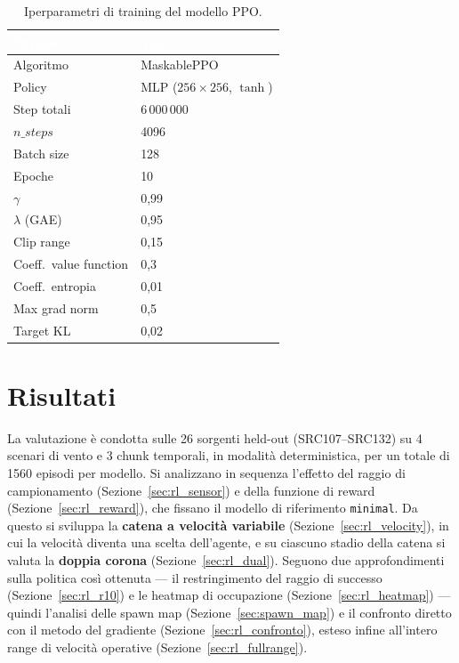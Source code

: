 \begin{table}[H]
\centering
\renewcommand{\arraystretch}{1.2}
\small
\begin{tabular}{L{5cm} C{4cm}}
\toprule
{}
\textcolor{white}{\textbf{Parametro}} & \textcolor{white}{\textbf{Valore}} \\
\midrule
Algoritmo            & MaskablePPO \\
Policy               & MLP ($256\times256$, $\tanh$) \\
Step totali          & $6\,000\,000$ \\
$n\_steps$           & 4096 \\
Batch size           & 128 \\
Epoche               & 10 \\
$\gamma$             & 0{,}99 \\
$\lambda$ (GAE)      & 0{,}95 \\
Clip range           & 0{,}15 \\
Coeff.\ value function & 0{,}3 \\
Coeff.\ entropia     & 0{,}01 \\
Max grad norm        & 0{,}5 \\
Target KL            & 0{,}02 \\
\bottomrule
\end{tabular}
\caption{Iperparametri di training del modello PPO.}
\label{tab:hyper}
\end{table}

\section{Risultati}
\label{sec:rl_risultati}

La valutazione \`e condotta sulle 26 sorgenti held-out (SRC107--SRC132) su 4 scenari di
vento e 3 chunk temporali, in modalit\`a deterministica, per un totale di 1560 episodi
per modello. Si analizzano in sequenza l'effetto del raggio di campionamento
(Sezione~\ref{sec:rl_sensor}) e della funzione di reward (Sezione~\ref{sec:rl_reward}),
che fissano il modello di riferimento \texttt{minimal}. Da questo si sviluppa la
\textbf{catena a velocit\`a variabile} (Sezione~\ref{sec:rl_velocity}), in cui la
velocit\`a diventa una scelta dell'agente, e su ciascuno stadio della catena si valuta la
\textbf{doppia corona} (Sezione~\ref{sec:rl_dual}). Seguono due approfondimenti sulla
politica cos\`i ottenuta --- il restringimento del raggio di successo
(Sezione~\ref{sec:rl_r10}) e le heatmap di occupazione (Sezione~\ref{sec:rl_heatmap}) ---
quindi l'analisi delle spawn map (Sezione~\ref{sec:spawn_map}) e il confronto diretto con
il metodo del gradiente (Sezione~\ref{sec:rl_confronto}), esteso infine all'intero range di
velocit\`a operative (Sezione~\ref{sec:rl_fullrange}).

